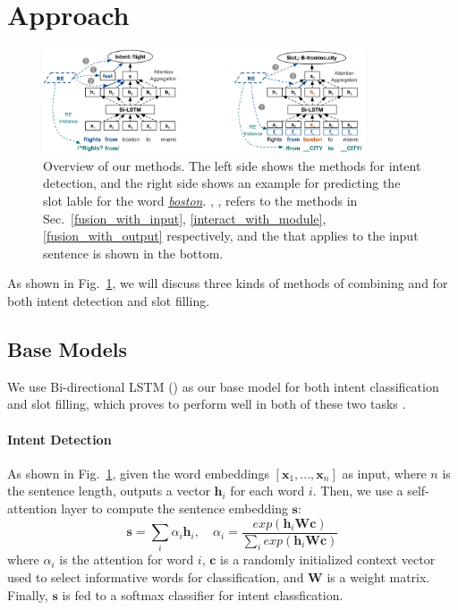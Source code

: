 \section{Approach}

\begin{figure}[t!]
\begin{center}
\includegraphics[width=0.85\textwidth]{figure/re_nn_overview.png}    
\caption{Overview of our methods. The left side shows the methods for intent detection, and the right side shows an example for predicting the slot lable for the word \textsl{\underline{boston}}. , ,  refers to the methods in Sec.~\ref{fusion_with_input}, \ref{interact_with_module}, \ref{fusion_with_output} respectively, and the \RE that applies to the input sentence is shown in the bottom.}
\label{fig_overview}
\end{center}
\vspace{-1em}
\end{figure}

As shown in Fig.~\ref{fig_overview}, we will discuss three kinds of methods of combining \NN and \RE for both intent detection and slot filling.

\subsection{Base Models}
We use Bi-directional LSTM (\BLSTM) as our base \NN model for both intent classification and slot filling, which proves to perform well in both of these two tasks \cite{liu2016attention}. 
\paragraph{Intent Detection}
As shown in Fig.~\ref{fig_overview}, given the word embeddings $[\textbf{x}_1, ..., \textbf{x}_n]$ as input, where $n$ is the sentence length, \BLSTM outputs a vector $\textbf{h}_i$ for each word $i$. 
Then, we use a self-attention layer to compute the sentence embedding $\textbf{s}$:
\begin{equation}
\textbf{s} = \sum_{i}{\alpha_i\textbf{h}_i}, \quad \alpha_i=\frac{exp(\textbf{h}_i\textbf{Wc})}{\sum_{i}{exp(\textbf{h}_i\textbf{Wc})}}
\end{equation}
where  $\alpha_i$ is the attention for word $i$, $\textbf{c}$ is a randomly initialized context vector used to select informative words for classification, and $\textbf{W}$ is a weight matrix. 
Finally, $\textbf{s}$ is fed to a softmax classifier for intent classfication.


